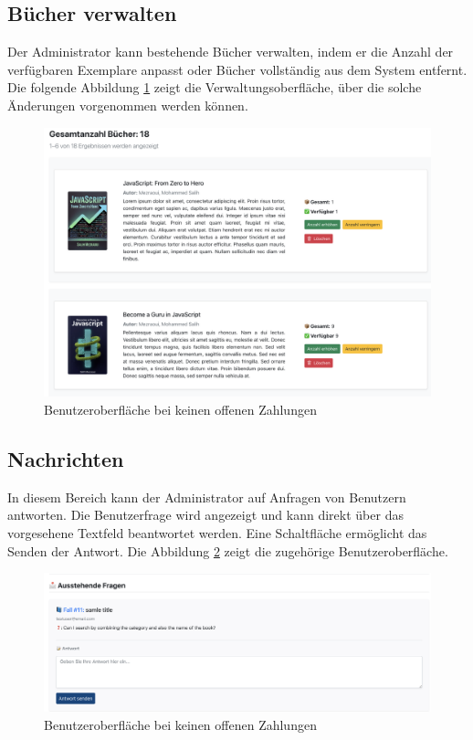 \subsection{Bücher verwalten}

\noindent Der Administrator kann bestehende Bücher verwalten, indem er die Anzahl der verfügbaren Exemplare anpasst oder Bücher vollständig aus dem System entfernt. Die folgende Abbildung \ref{fig:Manage-Books} zeigt die Verwaltungsoberfläche, über die solche Änderungen vorgenommen werden können.

\begin{figure}[H]
	\centering
	\includegraphics[width=1.0\textwidth]{images/UI-screenshots/Manage-Books.png}
	\caption{Benutzeroberfläche bei keinen offenen Zahlungen}
	\label{fig:Manage-Books}
\end{figure}
\subsection{Nachrichten}

\noindent In diesem Bereich kann der Administrator auf Anfragen von Benutzern antworten. Die Benutzerfrage wird angezeigt und kann direkt über das vorgesehene Textfeld beantwortet werden. Eine Schaltfläche ermöglicht das Senden der Antwort. Die Abbildung \ref{fig:Messages-Responses} zeigt die zugehörige Benutzeroberfläche.

\begin{figure}[H]
	\centering
	\includegraphics[width=1.0\textwidth]{images/UI-screenshots/Messages-Responses.png}
	\caption{Benutzeroberfläche bei keinen offenen Zahlungen}
	\label{fig:Messages-Responses}
\end{figure}




















